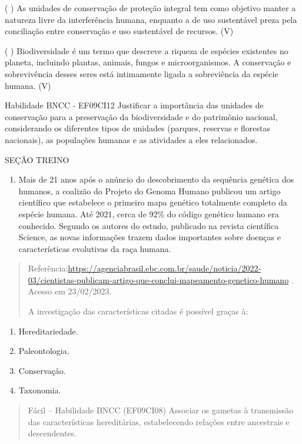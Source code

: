 ( ) As unidades de conservação de proteção integral tem como objetivo
manter a natureza livre da interferência humana, enquanto a de uso
sustentável preza pela conciliação entre conservação e uso sustentável
de recursos. (V)

( ) Biodiversidade é um termo que descreve a riqueza de espécies
existentes no planeta, incluindo plantas, animais, fungos e
microorganismos. A conservação e sobrevivência desses seres está
intimamente ligada a sobreviência da espécie humana. (V)

Habilidade BNCC - EF09CI12 Justificar a importância das unidades de
conservação para a preservação da biodiversidade e do patrimônio
nacional, considerando os diferentes tipos de unidades (parques,
reservas e florestas nacionais), as populações humanas e as atividades a
eles relacionados.

SEÇÃO TREINO

\begin{enumerate}
\def\labelenumi{\arabic{enumi}.}
\item
  Mais de 21 anos após o anúncio do descobrimento da sequência genética
  dos humanos, a coalizão do Projeto do Genoma Humano publicou um artigo
  científico que estabelece o primeiro mapa genético totalmente completo
  da espécie humana. Até 2021, cerca de 92\% do código genético humano
  era conhecido. Segundo os autores do estudo, publicado na revista
  científica Science, as novas informações trazem dados importantes
  sobre doenças e características evolutivas da raça humana.
\end{enumerate}

\begin{quote}
Referência:\url{https://agenciabrasil.ebc.com.br/saude/noticia/2022-03/cientistas-publicam-artigo-que-conclui-mapeamento-genetico-humano}
. Acesso em 23/02/2023.

A investigação das características citadas é possível graças à:
\end{quote}

\begin{enumerate}
\def\labelenumi{(\Alph{enumi})}
\item
  Hereditariedade.
\item
  Paleontologia.
\item
  Conservação.
\item
  Taxonomia.
\end{enumerate}

\begin{quote}
Fácil -- Habilidade BNCC (EF09CI08) Associar os gametas à transmissão
das características hereditárias, estabelecendo relações entre
ancestrais e descendentes.
\end{quote}


